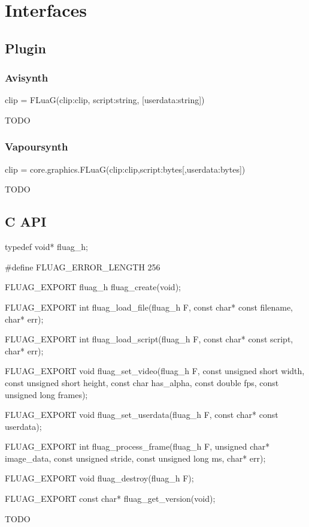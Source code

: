 \section{Interfaces}
\label{sec:interfaces}

\subsection{Plugin}
\label{sec:plugin}

\subsubsection{Avisynth}
\label{sec:avisynth}

clip = FLuaG(clip:clip, script:string, [userdata:string])

TODO

\subsubsection{Vapoursynth}
\label{sec:vapoursynth}

clip = core.graphics.FLuaG(clip:clip,script:bytes[,userdata:bytes])

TODO

\subsection{C API}
\label{sec:c-api}

typedef void* fluag_h;

#define FLUAG_ERROR_LENGTH 256

FLUAG_EXPORT fluag_h fluag_create(void);

FLUAG_EXPORT int fluag_load_file(fluag_h F, const char* const filename, char* err);

FLUAG_EXPORT int fluag_load_script(fluag_h F, const char* const script, char* err);

FLUAG_EXPORT void fluag_set_video(fluag_h F, const unsigned short width, const unsigned short height, const char has_alpha, const double fps, const unsigned long frames);

FLUAG_EXPORT void fluag_set_userdata(fluag_h F, const char* const userdata);

FLUAG_EXPORT int fluag_process_frame(fluag_h F, unsigned char* image_data, const unsigned stride, const unsigned long ms, char* err);

FLUAG_EXPORT void fluag_destroy(fluag_h F);

FLUAG_EXPORT const char* fluag_get_version(void);

TODO

